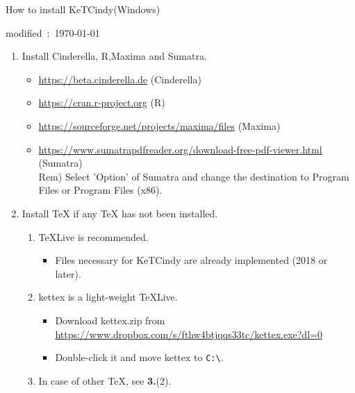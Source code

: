 \documentclass{article}
\begin{document}
\begin{center}
How to install KeTCindy(Windows)
\end{center}

\hfill modified\ :\ \today

\begin{enumerate}[\bf\large 1.]

\item Install Cinderella, R,Maxima and Sumatra.
 \begin{itemize}
 \item \url{https://beta.cinderella.de}  (Cinderella)
 \item \url{https://cran.r-project.org}   (R)
 \item \url{https://sourceforge.net/projects/maxima/files}  (Maxima)
 \item \url{https://www.sumatrapdfreader.org/download-free-pdf-viewer.html} (Sumatra)\\
\hspace*{5mm}Rem) Select 'Option' of Sumatra and change the destination to Program Files or Program Files (x86).
 \end{itemize}

\item Install TeX if any TeX has not been installed.
  \begin{enumerate}[(1)]
  \item TeXLive is recommended.
    \begin{itemize}
    \item Files necessary for KeTCindy are already implemented (2018 or later).
    \end{itemize}
  \item kettex is a light-weight TeXLive.
    \begin{itemize}
    \item Download kettex.zip from\\
    \hspace*{10mm}\url{https://www.dropbox.com/s/fthw4btjqqs33tc/kettex.exe?dl=0}
    \item Double-click it and move kettex to \verb|C:\|.
    \end{itemize}
  \item In case of other TeX, see {\bf 3.}(2).
 \end{enumerate}



\end{enumerate}
\end{document}
